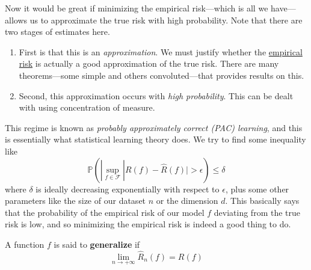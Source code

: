 Now it would be great if minimizing the empirical risk---which is all we have---allows us to approximate the true risk with high probability. Note that there are two stages of estimates here. 
\begin{enumerate}
  \item First is that this is an \textit{approximation}. We must justify whether the \hyperref[def:empirical-risk]{empirical risk} is actually a good approximation of the true risk. There are many theorems---some simple and others convoluted---that provides results on this. 
  \item Second, this approximation occurs with \textit{high probability}. This can be dealt with using concentration of measure. 
\end{enumerate}
This regime is known as \textit{probably approximately correct (PAC) learning}, and this is essentially what statistical learning theory does. We try to find some inequality like 
\begin{equation}
  \mathbb{P}( | \sup_{f \in \mathcal{F}} |R(f) - \hat{R}(f)| > \epsilon ) \leq \delta
\end{equation}
where $\delta$ is ideally decreasing exponentially with respect to $\epsilon$, plus some other parameters like the size of our dataset $n$ or the dimension $d$. This basically says that the probability of the empirical risk of our model $f$ deviating from the true risk is low, and so minimizing the empirical risk is indeed a good thing to do. 

\begin{definition}[Generalize]
  \label{def:generalize}
  A function $f$ is said to \textbf{generalize} if 
  \begin{equation}
    \lim_{n \rightarrow +\infty} \hat{R}_n (f) = R(f)
  \end{equation}
\end{definition}

